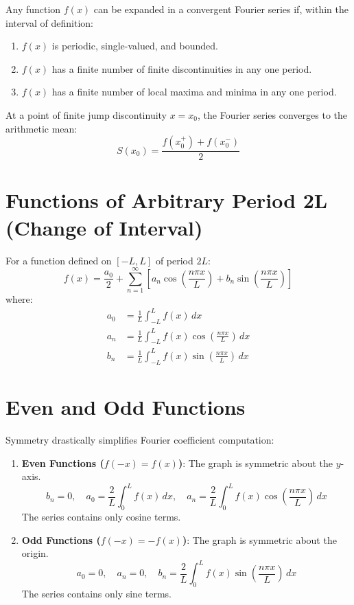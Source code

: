 \begin{theorem}
Any function $f(x)$ can be expanded in a convergent Fourier series if, within the interval of definition:
\begin{enumerate}
    \item $f(x)$ is periodic, single-valued, and bounded.
    \item $f(x)$ has a finite number of finite discontinuities in any one period.
    \item $f(x)$ has a finite number of local maxima and minima in any one period.
\end{enumerate}
At a point of finite jump discontinuity $x = x_0$, the Fourier series converges to the arithmetic mean:
\begin{equation}
S(x_0) = \frac{f(x_0^+) + f(x_0^-)}{2}
\end{equation}
\end{theorem}

\section{Functions of Arbitrary Period 2L (Change of Interval)}
For a function defined on $[-L, L]$ of period $2L$:
\begin{equation}
f(x) = \frac{a_0}{2} + \sum_{n=1}^{\infty} \left[ a_n \cos\left(\frac{n\pi x}{L}\right) + b_n \sin\left(\frac{n\pi x}{L}\right) \right]
\end{equation}
where:
\begin{align}
a_0 &= \frac{1}{L} \int_{-L}^{L} f(x) \, dx \\
a_n &= \frac{1}{L} \int_{-L}^{L} f(x) \cos\left(\frac{n\pi x}{L}\right) \, dx \\
b_n &= \frac{1}{L} \int_{-L}^{L} f(x) \sin\left(\frac{n\pi x}{L}\right) \, dx
\end{align}

\section{Even and Odd Functions}
Symmetry drastically simplifies Fourier coefficient computation:
\begin{enumerate}
    \item \textbf{Even Functions ($f(-x) = f(x)$)}: The graph is symmetric about the $y$-axis.
    \begin{equation}
    b_n = 0, \quad a_0 = \frac{2}{L}\int_0^L f(x)\,dx, \quad a_n = \frac{2}{L}\int_0^L f(x)\cos\left(\frac{n\pi x}{L}\right)\,dx
    \end{equation}
    The series contains only cosine terms.
    \item \textbf{Odd Functions ($f(-x) = -f(x)$)}: The graph is symmetric about the origin.
    \begin{equation}
    a_0 = 0, \quad a_n = 0, \quad b_n = \frac{2}{L}\int_0^L f(x)\sin\left(\frac{n\pi x}{L}\right)\,dx
    \end{equation}
    The series contains only sine terms.
\end{enumerate}

